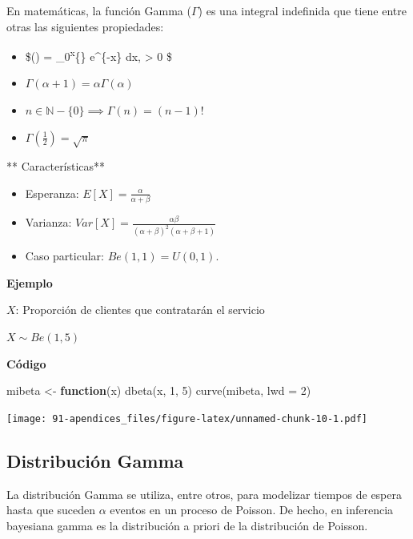 \documentclass[
]{book}
\newenvironment{Shaded}{\begin{snugshade}}{\end{snugshade}}
\newcommand{\AttributeTok}[1]{\textcolor[rgb]{0.77,0.63,0.00}{#1}}
\newcommand{\ControlFlowTok}[1]{\textcolor[rgb]{0.13,0.29,0.53}{\textbf{#1}}}
\newcommand{\DecValTok}[1]{\textcolor[rgb]{0.00,0.00,0.81}{#1}}
\newcommand{\FunctionTok}[1]{\textcolor[rgb]{0.00,0.00,0.00}{#1}}
\newcommand{\NormalTok}[1]{#1}
\newcommand{\OtherTok}[1]{\textcolor[rgb]{0.56,0.35,0.01}{#1}}
\providecommand{\tightlist}{%
  \setlength{\itemsep}{0pt}\setlength{\parskip}{0pt}}
\begin{document}
En matemáticas, la función Gamma (\(\Gamma\)) es una integral indefinida que tiene entre otras las siguientes propiedades:

\begin{itemize}
\tightlist
\item
  \$\Gamma(\alpha) = \int\_0\textsuperscript{\infty x}\{\} e\^{}\{-x\} dx, \qquad \alpha \textgreater{} 0 \$
\item
  \(\Gamma(\alpha + 1) = \alpha \Gamma(\alpha)\)
\item
  \(n \in \mathbb{N}-\{0\} \implies \Gamma(n) = (n-1)!\)
\item
  \(\Gamma(\frac{1}{2}) = \sqrt{\pi}\)
\end{itemize}

** Características**

\begin{itemize}
\tightlist
\item
  Esperanza: \(E[X] = \frac{\alpha}{\alpha + \beta}\)
\item
  Varianza: \(\mathit{Var}[X] = \frac{\alpha\beta}{(\alpha + \beta)^2(\alpha + \beta+1)}\)
\item
  Caso particular: \(\mathit{Be}(1,1) = U(0,1)\).
\end{itemize}

\textbf{Ejemplo}

\(X\): Proporción de clientes que contratarán el servicio

\(X\sim \mathit{Be}(1, 5)\)

\textbf{Código}

\begin{Shaded}
\begin{Highlighting}[]
\NormalTok{mibeta }\OtherTok{\textless{}{-}} \ControlFlowTok{function}\NormalTok{(x) }\FunctionTok{dbeta}\NormalTok{(x, }\DecValTok{1}\NormalTok{, }\DecValTok{5}\NormalTok{)}
\FunctionTok{curve}\NormalTok{(mibeta, }\AttributeTok{lwd =} \DecValTok{2}\NormalTok{)}
\end{Highlighting}
\end{Shaded}

\texttt{[image: 91-apendices\_files/figure-latex/unnamed-chunk-10-1.pdf]}

\hypertarget{distribuciuxf3n-gamma}{%
\subsection{Distribución Gamma}\label{distribuciuxf3n-gamma}}

La distribución Gamma se utiliza, entre otros, para modelizar tiempos de espera hasta que suceden \(\alpha\) eventos en un proceso de Poisson. De hecho, en inferencia bayesiana gamma es la distribución a priori de la distribución de Poisson.
\end{document}

